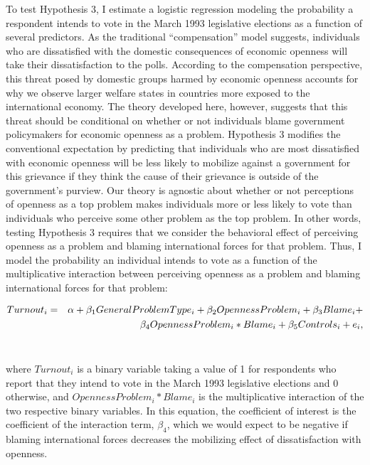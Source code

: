 \documentclass[12pt]{report}
\begin{document}
\begin{doublespace} To test Hypothesis 3, I estimate a logistic regression modeling the probability
a respondent intends to vote in the March 1993 legislative elections as a function of several
predictors. As the traditional ``compensation'' model suggests, individuals who are dissatisfied
with the domestic consequences of economic openness will take their dissatisfaction to the polls.
According to the compensation perspective, this threat posed by domestic groups harmed by economic
openness accounts for why we observe larger welfare states in countries more exposed to the
international economy. The theory developed here, however, suggests that this threat should be
conditional on whether or not individuals blame government policymakers for economic openness as a
problem. Hypothesis 3 modifies the conventional expectation by predicting that individuals who are
most dissatisfied with economic openness will be less likely to mobilize against a government for
this grievance if they think the cause of their grievance is outside of the government's purview.
Our theory is agnostic about whether or not perceptions of openness as a top problem makes
individuals more or less likely to vote than individuals who perceive some other problem as the top
problem. In other words, testing Hypothesis 3 requires that we consider the behavioral effect of
perceiving openness as a problem and blaming international forces for that problem. Thus, I model
the probability an individual intends to vote as a function of the multiplicative interaction
between perceiving openness as a problem and blaming international forces for that problem:
\end{doublespace}

\begin{eqnarray} Turnout_{i}& =
&\alpha+\beta_{1}GeneralProblemType_{i}+\beta_{2}OpennessProblem_{i}+ \beta_{3}Blame_{i} + \notag \\
&  & \beta_{4}OpennessProblem_{i}*Blame_{i}+\beta_{5}Controls_{i}+e_{i},
\end{eqnarray}$\begin{aligned}\end{aligned} $

\begin{doublespace} \noindent where $Turnout_{i}$ is a binary variable taking a value of 1 for
respondents who report that they intend to vote in the March 1993 legislative elections and 0
otherwise, and $OpennessProblem_{i}*Blame_{i}$ is the multiplicative interaction of the two
respective binary variables. In this equation, the coefficient of interest is the coefficient of the
interaction term, $\beta_{4}$, which we would expect to be negative if blaming international forces
decreases the mobilizing effect of dissatisfaction with openness. \end{doublespace}
\end{document}
